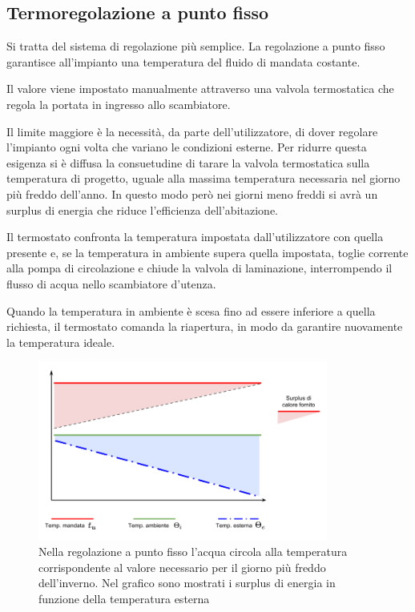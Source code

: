 \documentclass[laurea,oneside,11pt]{USiena_tesiLM}
\begin{document}

\subsection{Termoregolazione a punto fisso}
Si tratta del sistema di regolazione più semplice. La regolazione a punto fisso garantisce all'impianto una temperatura del fluido di mandata costante. 

Il valore viene impostato manualmente attraverso una valvola termostatica che regola la portata in ingresso allo scambiatore.  

Il limite maggiore è la necessità, da parte dell'utilizzatore, di dover regolare l'impianto ogni volta che variano le condizioni esterne. Per ridurre questa esigenza si è diffusa la consuetudine di tarare la valvola termostatica sulla temperatura di progetto, uguale alla massima temperatura necessaria nel giorno più freddo dell'anno. In questo modo però nei giorni meno freddi si avrà un surplus di energia che riduce l'efficienza dell'abitazione.

Il termostato confronta la temperatura impostata dall'utilizzatore con quella presente e, se la temperatura in ambiente supera quella impostata, toglie corrente alla pompa di circolazione e chiude la valvola di laminazione, interrompendo il flusso di acqua nello scambiatore d'utenza. 

Quando la temperatura in ambiente è scesa fino ad essere inferiore a quella richiesta, il termostato comanda la riapertura, in modo da garantire nuovamente la temperatura ideale.

\begin{figure}[!ht]
\centering
\includegraphics[width=0.85\textwidth]{figure/surplus} 
\caption{Nella regolazione a punto fisso l'acqua circola alla temperatura corrispondente al valore necessario per il giorno più freddo dell'inverno. Nel grafico sono mostrati i surplus di energia in funzione della temperatura esterna}
\label{fig:surplus}
\end{figure}
\end{document}
